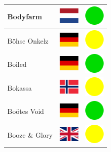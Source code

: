 \documentclass[12pt, a4paper, twoside]{report}
\begin{document}
\begin{center}
\begin{longtable}{|p{5cm}|p{2cm}|p{2cm}|}
 Bodyfarm                                                   & \includegraphics[width=1cm]{../img/flags/nl} &   \includegraphics[width=1cm]{../likes/y} \\ \hline
 Böhse Onkelz                                               & \includegraphics[width=1cm]{../img/flags/de} &   \includegraphics[width=1cm]{../likes/m} \\ \hline
 Boiled                                                     & \includegraphics[width=1cm]{../img/flags/de} &   \includegraphics[width=1cm]{../likes/y} \\ \hline
 Bokassa                                                    & \includegraphics[width=1cm]{../img/flags/no} &   \includegraphics[width=1cm]{../likes/m} \\ \hline
 Boötes Void                                                & \includegraphics[width=1cm]{../img/flags/de} &   \includegraphics[width=1cm]{../likes/y} \\ \hline
 Booze \& Glory                                             & \includegraphics[width=1cm]{../img/flags/gb} &   \includegraphics[width=1cm]{../likes/m} \\ \hline

\end{longtable}
\end{center}
\end{document}

